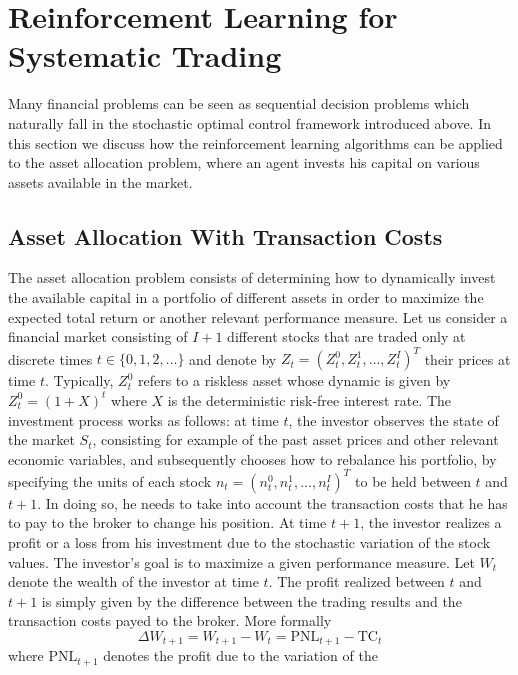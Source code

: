\section{Reinforcement Learning for Systematic Trading}
\label{sec:application_to_systematic_trading}

Many financial problems can be seen as sequential decision problems which naturally fall in the stochastic optimal control framework introduced above. In this section we discuss how the reinforcement learning algorithms can be applied to the asset allocation problem, where an agent invests his capital on various assets available in the market.  

\subsection{Asset Allocation With Transaction Costs} 
The asset allocation problem consists of determining how to dynamically invest the available capital in a portfolio of different assets in order to maximize the expected total return or another relevant performance measure. Let us consider a financial market consisting of $I+1$ different stocks that are traded only at discrete times $t \in \{0, 1, 2, \ldots\}$ and denote by ${Z}_t = {(Z_t^0, Z_t^1, \ldots, Z_t^I)}^T$ their prices at time $t$. Typically, $Z_t^0$ refers to a riskless asset whose dynamic is given by $Z_t^0 = {(1 + X)}^t$ where $X$ is the deterministic risk-free interest rate. The investment process works as follows: at time $t$, the investor observes the
state of the market $S_t$, consisting for example of the past asset prices and other relevant economic variables, and subsequently chooses how to rebalance his portfolio, by specifying the units of each stock ${n}_t = {(n_t^0 , n_t^1 , \ldots , n_t^I)}^T$ to be held between $t$ and $t+1$. In doing so, he needs to take into account the transaction costs that he has to pay to the broker to change his position.  At time $t+1$, the investor realizes a profit or a loss from his investment due to the stochastic variation of the stock values. The investor’s goal is to maximize a given performance measure. Let $W_t$ denote the wealth of the investor at time $t$. The profit realized between $t$ and $t+1$ is simply given by the difference between the trading results and the transaction costs payed to the broker. More formally
\begin{equation*}
	\Delta W_{t+1} = W_{t+1} - W_t = \text{PNL}_{t+1} - \text{TC}_{t}	
\end{equation*}
where $\text{PNL}_{t+1}$ denotes the profit due to the variation of the
